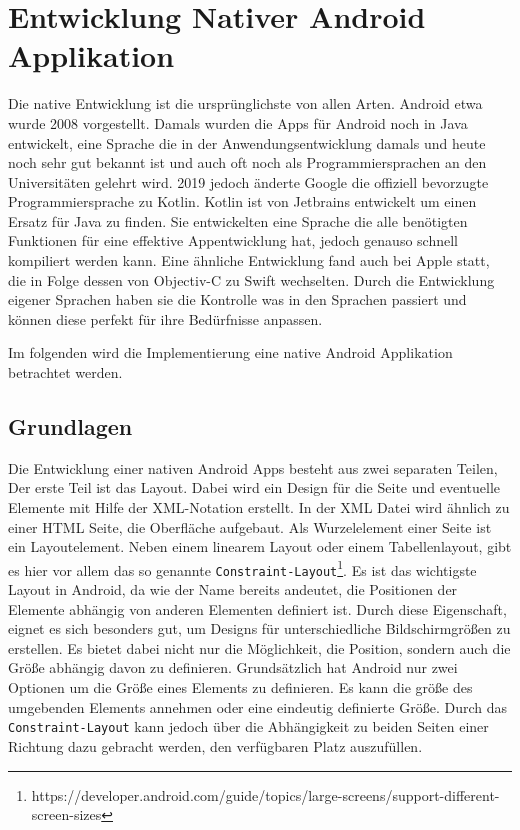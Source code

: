 \section{Entwicklung Nativer Android Applikation}
Die native Entwicklung ist die ursprünglichste von allen Arten. Android etwa wurde 2008 vorgestellt. 
Damals wurden die Apps für Android noch in Java entwickelt, eine Sprache die in der Anwendungsentwicklung damals und heute noch sehr gut bekannt ist und auch oft noch als Programmiersprachen an den Universitäten gelehrt wird. 
2019 jedoch änderte Google die offiziell bevorzugte Programmiersprache zu Kotlin. 
Kotlin ist von Jetbrains entwickelt um einen Ersatz für Java zu finden. 
Sie entwickelten eine Sprache die alle benötigten Funktionen für eine effektive Appentwicklung hat, jedoch genauso schnell kompiliert werden kann. 
Eine ähnliche Entwicklung fand auch bei Apple statt, die in Folge dessen von Objectiv-C zu Swift wechselten. 
Durch die Entwicklung eigener Sprachen haben sie die Kontrolle was in den Sprachen passiert und können diese perfekt für ihre Bedürfnisse anpassen.

Im folgenden wird die Implementierung eine native Android Applikation betrachtet werden.

\subsection{Grundlagen}

Die Entwicklung einer nativen Android \acp{App} besteht aus zwei separaten Teilen, Der erste Teil ist das Layout. Dabei wird ein Design für die Seite und eventuelle Elemente mit Hilfe der XML-Notation erstellt.
In der XML Datei wird ähnlich zu einer HTML Seite, die Oberfläche aufgebaut. Als Wurzelelement einer Seite ist ein Layoutelement. Neben einem linearem Layout oder einem Tabellenlayout, gibt es hier vor allem das so genannte \verb|Constraint-Layout|\footnote{https://developer.android.com/guide/topics/large-screens/support-different-screen-sizes}. 
Es ist das wichtigste Layout in Android, da wie der Name bereits andeutet, die Positionen der Elemente abhängig von anderen Elementen definiert ist. Durch diese Eigenschaft, eignet es sich besonders gut, um Designs für unterschiedliche Bildschirmgrößen zu erstellen. Es bietet dabei nicht nur die Möglichkeit, die Position, sondern auch die Größe abhängig davon zu definieren. Grundsätzlich hat Android nur zwei Optionen um die Größe eines Elements zu definieren. Es kann die größe des umgebenden Elements annehmen oder eine eindeutig definierte Größe. Durch das \verb|Constraint-Layout| kann jedoch über die Abhängigkeit zu beiden Seiten einer Richtung dazu gebracht werden, den verfügbaren Platz auszufüllen.

